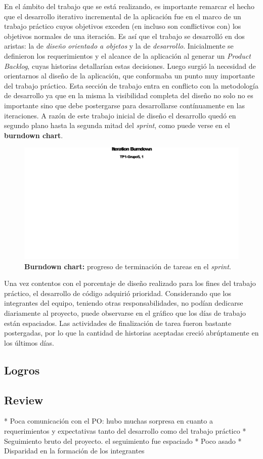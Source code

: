\documentclass[10pt, a4paper]{article}
\begin{document}
En el ámbito del trabajo que se está realizando, es importante remarcar el hecho que el desarrollo iterativo incremental de la aplicación fue en el marco de un trabajo práctico cuyos objetivos exceden (en incluso son conflictivos con) los objetivos normales de una iteración. Es así que el trabajo se desarrolló en dos aristas: la de \emph{diseño orientado a objetos} y la de \emph{desarrollo}. Inicialmente se definieron los requerimientos y el alcance de la aplicación al generar un \emph{Product Backlog}, cuyas historias detallarían estas decisiones. Luego surgió la necesidad de orientarnos al diseño de la aplicación, que conformaba un punto muy importante del trabajo práctico. Esta sección de trabajo entra en conflicto con la metodología de desarrollo ya que en la misma la visibilidad completa del diseño no solo no es importante sino que debe postergarse para desarrollarse contínuamente en las iteraciones. A razón de este trabajo inicial de diseño el desarrollo quedó en segundo plano hasta la segunda mitad del \emph{sprint}, como 
puede verse en el \textbf{burndown chart}.

\begin{figure}[H]
\centering
\includegraphics[width=\textwidth]{graphics/iteration_burndown.pdf}
\caption{\textbf{Burndown chart:} progreso de terminación de tareas en el \emph{sprint}.}
\end{figure}

Una vez contentos con el porcentaje de diseño realizado para los fines del trabajo práctico, el desarrollo de código adquirió prioridad. Considerando que los integrantes del equipo, teniendo otras responsabilidades, no podían dedicarse diariamente al proyecto, puede observarse en el gráfico que los días de trabajo están espaciados. Las actividades de finalización de tarea fueron bastante postergadas, por lo que la cantidad de historias aceptadas creció abrúptamente en los últimos días.

\subsection{Logros}

\subsection{Review}

* Poca comunicación con el PO: hubo muchas sorpresa en cuanto a requerimientos y expectativas tanto del desarrollo como del trabajo práctico
* Seguimiento bruto del proyecto. el seguimiento fue espaciado
* Poco asado
* Disparidad en la formación de los integrantes
\end{document}

